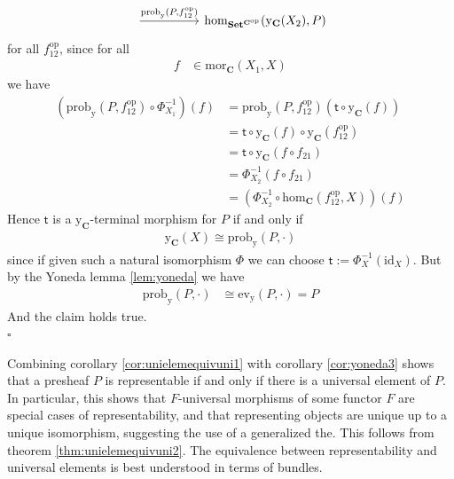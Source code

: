 \begin{prf}
\[\begin{tikzcd}[sep=huge]
  \arrow{r}{\mathrm{prob}_{\mathrm{y}}(P,f_{12}^{\mathrm{op}})}
  &
  \mathrm{hom}_{\mathbf{Set}^{\mathbf{C}^{\mathrm{op}}}}
  (\mathrm{y}_{\mathbf{C}}(X_{2}),P)
\end{tikzcd}
\]
for all $f_{12}^{\mathrm{op}}$, since for all
\begin{align*}
  f
  &\in
  \mathrm{mor}_{\mathbf{C}}(X_{1},X)
\end{align*}
we have
\begin{align*}
  \left(
    \mathrm{prob}_{\mathrm{y}}(P,f_{12}^{\mathrm{op}})
    \circ
    \Phi_{X_{1}}^{-1}
  \right)
  (f)
  &=
  \mathrm{prob}_{\mathrm{y}}(P,f_{12}^{\mathrm{op}})
  \left(
    \mathsf{t}
    \circ
    \mathrm{y}_{\mathbf{C}}(f)
  \right)
  \\
  &=
  \mathsf{t}
  \circ
  \mathrm{y}_{\mathbf{C}}(f)
  \circ
  \mathrm{y}_{\mathbf{C}}(f_{12}^{\mathrm{op}})
  \\
  &=
  \mathsf{t}
  \circ
  \mathrm{y}_{\mathbf{C}}(f \circ f_{21})
  \\
  &=
  \Phi_{X_{2}}^{-1}(f \circ f_{21})
  \\
  &=
  \left(
    \Phi_{X_{2}}^{-1}
    \circ
    \mathrm{hom}_{\mathbf{C}}(f_{12}^{\mathrm{op}},X)
  \right)
  (f)
\end{align*}
Hence $\mathsf{t}$ is a $\mathrm{y}_{\mathbf{C}}$-terminal morphism for $P$ if and only if
\begin{align*}
  \mathrm{y}_{\mathbf{C}}(X)
  \cong
  \mathrm{prob}_{\mathrm{y}}(P,\cdot)
\end{align*}
since if given such a natural isomorphism $\Phi$ we can choose $\mathsf{t} := \Phi_{X}^{-1}(\mathrm{id}_{X})$.
But by the Yoneda lemma \ref{lem:yoneda} we have
\begin{align*}
  \mathrm{prob}_{\mathrm{y}}(P,\cdot)
  &\cong
  \mathrm{ev}_{\mathrm{y}}(P,\cdot)
  =
  P
\end{align*}
And the claim holds true.
\\
\phantom{proven}
\hfill
$\square$
\end{prf}
Combining corollary \ref{cor:unielemequivuni1} with corollary \ref{cor:yoneda3} shows that a presheaf $P$ is representable if and only if there is a universal element of $P$.
In particular, this shows that $F$-universal morphisms of some functor $F$ are special cases of representability, and that representing objects are unique up to a unique isomorphism, suggesting the use of a generalized {\glqq}the{\grqq}.
This follows from theorem \ref{thm:unielemequivuni2}.
The equivalence between representability and universal elements is best understood in terms of bundles.

